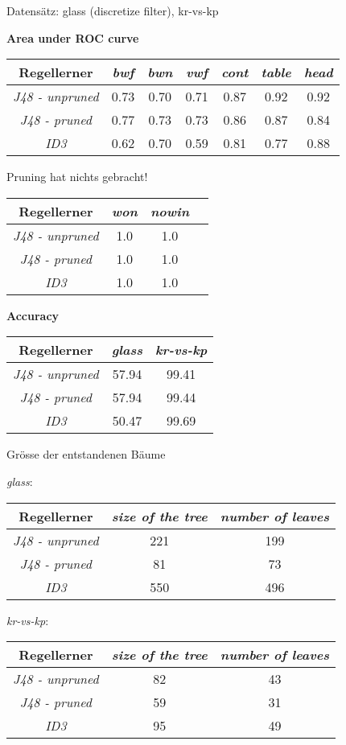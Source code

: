 
Datens\"atz: glass (discretize filter), kr-vs-kp

\textbf{Area under ROC curve}
\begin{tabular}{c|c|c|c|c|c|c}
				Regellerner       & \emph{bwf} & \emph{bwn} & \emph{vwf}  & \emph{cont} & \emph{table} & \emph{head} \\ \hline
				\emph{J48 - unpruned}& 0.73 & 0.70 & 0.71 & 0.87 & 0.92 & 0.92 \\ \hline
				\emph{J48 - pruned}  & 0.77 & 0.73 & 0.73 & 0.86 & 0.87 & 0.84 \\ \hline
				\emph{ID3}           & 0.62 & 0.70 & 0.59 & 0.81 & 0.77 & 0.88 \\ \hline
\end{tabular}

Pruning hat nichts gebracht!

\begin{tabular}{c|c|c|c}
				Regellerner       & \emph{won} & \emph{nowin} \\ \hline
				\emph{J48 - unpruned} & 1.0 & 1.0  \\ \hline
				\emph{J48 - pruned}  & 1.0 & 1.0  \\ \hline
				\emph{ID3}  & 1.0 & 1.0 \\ \hline
\end{tabular}


\textbf{Accuracy}
\begin{tabular}{c|c|c}
				Regellerner       & \emph{glass} & \emph{kr-vs-kp}  \\ \hline
				\emph{J48 - unpruned}  & 57.94 & 99.41 \\ \hline
				\emph{J48 - pruned} & 57.94  & 99.44 \\ \hline
				\emph{ID3}  & 50.47 & 99.69\\ \hline
\end{tabular}

Gr\"osse der entstandenen B\"aume

\emph{glass}:
\begin{tabular}{c|c|c}
	Regellerner       & \emph{size of the tree} & \emph{number of leaves}  \\ \hline
	\emph{J48 - unpruned} & 221  & 199  \\ \hline
	\emph{J48 - pruned}   & 81   & 73   \\ \hline
	\emph{ID3}            & 550  & 496  \\ \hline
\end{tabular}


\emph{kr-vs-kp}:
\begin{tabular}{c|c|c}
	Regellerner       & \emph{size of the tree} & \emph{number of leaves}  \\ \hline
	\emph{J48 - unpruned}  & 82 & 43 \\ \hline
	\emph{J48 - pruned} & 59  & 31 \\ \hline
	\emph{ID3}  & 95 & 49\\ \hline
\end{tabular}
